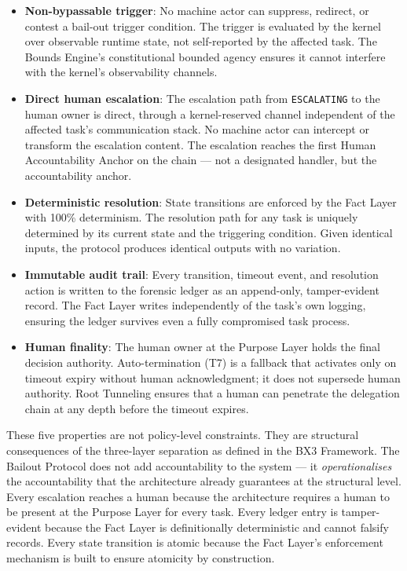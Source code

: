 \begin{itemize}
\item \textbf{Non-bypassable trigger}: No machine actor can suppress, redirect, or contest a bail-out trigger condition. The trigger is evaluated by the kernel over observable runtime state, not self-reported by the affected task. The Bounds Engine's constitutional bounded agency ensures it cannot interfere with the kernel's observability channels.

\item \textbf{Direct human escalation}: The escalation path from \texttt{ESCALATING} to the human owner is direct, through a kernel-reserved channel independent of the affected task's communication stack. No machine actor can intercept or transform the escalation content. The escalation reaches the first Human Accountability Anchor on the chain — not a designated handler, but the accountability anchor.

\item \textbf{Deterministic resolution}: State transitions are enforced by the Fact Layer with 100\% determinism. The resolution path for any task is uniquely determined by its current state and the triggering condition. Given identical inputs, the protocol produces identical outputs with no variation.

\item \textbf{Immutable audit trail}: Every transition, timeout event, and resolution action is written to the forensic ledger as an append-only, tamper-evident record. The Fact Layer writes independently of the task's own logging, ensuring the ledger survives even a fully compromised task process.

\item \textbf{Human finality}: The human owner at the Purpose Layer holds the final decision authority. Auto-termination (T7) is a fallback that activates only on timeout expiry without human acknowledgment; it does not supersede human authority. Root Tunneling ensures that a human can penetrate the delegation chain at any depth before the timeout expires.
\end{itemize}

These five properties are not policy-level constraints. They are structural consequences of the three-layer separation as defined in the BX3 Framework. The Bailout Protocol does not add accountability to the system — it \textit{operationalises} the accountability that the architecture already guarantees at the structural level. Every escalation reaches a human because the architecture requires a human to be present at the Purpose Layer for every task. Every ledger entry is tamper-evident because the Fact Layer is definitionally deterministic and cannot falsify records. Every state transition is atomic because the Fact Layer's enforcement mechanism is built to ensure atomicity by construction.

